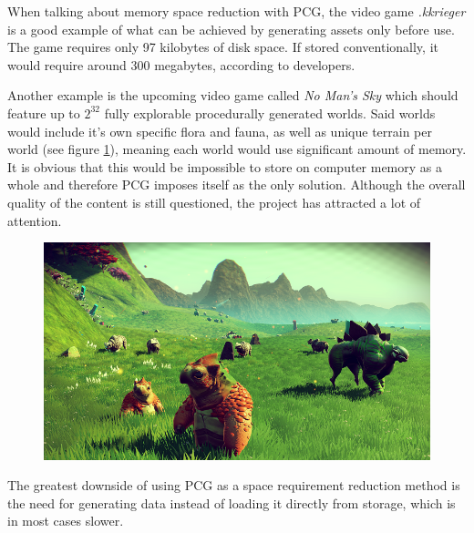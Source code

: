 \documentclass[journal]{IEEEtran}
\begin{document}
When talking about memory space reduction with PCG, the video game \textit{.kkrieger} is a good example of what can be achieved by generating assets only before use. The game requires only 97 kilobytes of disk space. If stored conventionally, it would require around 300 megabytes, according to developers.
\par
Another example is the upcoming video game called \textit{No Man's Sky} which should feature up to $2^{32}$ fully explorable procedurally generated worlds. Said worlds would include it's own specific flora and fauna, as well as unique terrain per world (see figure \ref{fig:nomansky}), meaning each world would use significant amount of memory. It is obvious that this would be impossible to store on computer memory as a whole and therefore PCG imposes itself as the only solution. Although the overall quality of the content is still questioned, the project has attracted a lot of attention.
\begin{figure}[H]
	\centering
	\includegraphics[width=.8\linewidth]{NoMansSky.png}
	\label{fig:nomansky}
\end{figure}
\par
The greatest downside of using PCG as a space requirement reduction method is the need for generating data instead of loading it directly from storage, which is in most cases slower.
\end{document}
